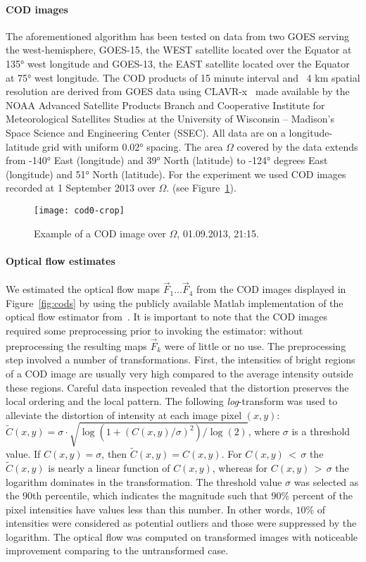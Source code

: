 \documentclass[onecolumn, 12pt, conference]{ieeeconf}
\def\F{\vec{F}}
\begin{document}
\paragraph{COD images} The aforementioned algorithm has been tested on data from two GOES serving the west-hemisphere, GOES-15, the WEST satellite located over the Equator at \ang{135} west longitude and GOES-13, the EAST satellite located over the Equator at \ang{75} west longitude. The COD products of 15 minute interval and ~4 km spatial resolution are derived from GOES data using CLAVR-x~\cite{Thomas_Met_2004} made available by the NOAA Advanced Satellite Products Branch and Cooperative Institute for Meteorological Satellites Studies at the University of Wisconsin – Madison’s Space Science and Engineering Center (SSEC).
All data are on a longitude-latitude grid with uniform \ang{0.02} spacing. The area $\Omega$ covered by the data extends from \ang{-140} East (longitude) and \ang{39} North (latitude) to \ang{-124} degrees East (longitude) and \ang{51} North (latitude). For the experiment we used COD images recorded at 1 September 2013 over $\Omega$. (see Figure~\ref{fig:cod0}).
\begin{figure}[h]
  \centering
  \texttt{[image: cod0-crop]}
  \caption{Example of a COD image over $\Omega$, 01.09.2013, 21:15. \label{fig:cod0}}
\end{figure}

\paragraph{Optical flow estimates} We estimated the optical flow maps $\F_{1}\dots \F_{4}$ from the COD images displayed in Figure~\ref{fig:cods} by using the publicly available Matlab implementation of the optical flow estimator from~\cite{sun13}. It is important to note that the COD images required some preprocessing prior to invoking the estimator: without preprocessing the resulting maps $\F_k$ were of little or no use. The preprocessing step involved a number of transformations. First, the intensities of bright regions of a COD image are usually very high compared to the average intensity outside these regions. Careful data inspection revealed that the distortion preserves the local ordering and the local pattern. The following \textit{log}-transform was used to alleviate the distortion of intensity at each image pixel $(x,y)$: $\tilde{C}(x,y) =
\sigma \cdot \sqrt{\log{(1 + (C(x,y)/\sigma)^2)}/\log{(2)}}$, where $\sigma$ is a threshold value. If $C(x,y) = \sigma$, then $\tilde{C}(x,y) = C(x,y)$. For $C(x,y)\,{<}\,\sigma$ the $\tilde{C}(x,y)$ is nearly a linear function of $C(x,y)$, whereas for $C(x,y)\,{>}\,\sigma$ the logarithm dominates in the transformation. The threshold value $\sigma$ was selected as the $90$th percentile, which indicates the magnitude such that $90$\% percent of the pixel intensities have values less than this number. In other words, $10$\% of intensities were considered as potential outliers and those were suppressed by the logarithm. The optical flow was computed on transformed images with noticeable improvement comparing to the untransformed case.
\end{document}
